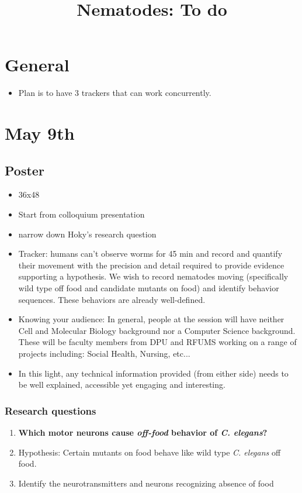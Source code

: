 \documentclass{article}
\begin{document}
\title{Nematodes: To do}
\maketitle

\setcounter{enumi}{0}
\setcounter{section}{0}
\section{General}
\begin{itemize}
\item Plan is to have 3 trackers that can work concurrently.
\end{itemize}


\section{May 9th}
\subsection{Poster}
\begin{itemize} 
\item 36x48
\item Start from colloquium presentation
\item narrow down Hoky's research question
\item Tracker: humans can't observe worms for 45 min and record and quantify their movement with the precision and detail required to provide evidence supporting a hypothesis. We wish to record nematodes moving (specifically wild type off food and candidate mutants on food) and identify behavior sequences. These behaviors are already well-defined.
\item Knowing your audience: In general, people at the session will have neither Cell and Molecular Biology background nor a Computer Science background. These will be faculty members from DPU and RFUMS working on a range of projects including: Social Health, Nursing, etc...
\item In this light, any technical information provided (from either side) needs to be well explained, accessible yet engaging and interesting. 
\end{itemize}




\subsubsection{Research questions}
\begin{enumerate}
\item \textbf{Which motor neurons cause \textit{off-food} behavior of \textit{C. elegans}?}
\item Hypothesis: Certain mutants on food behave like wild type \textit{C. elegans} off food.
\item Identify the neurotransmitters and neurons recognizing absence of food
\end{enumerate}
\end{document}
